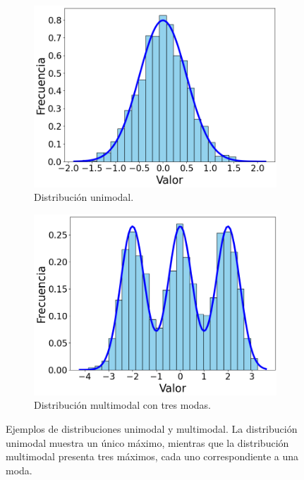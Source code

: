 \begin{figure}[h]
    \centering
    \begin{subfigure}[b]{0.43\textwidth}
        \centering
        \includegraphics[width=\textwidth]{img/experiments/unimodal.png}
        \caption{Distribución unimodal.}\label{fig:unimodal}
    \end{subfigure}
    \hfill
    \begin{subfigure}[b]{0.43\textwidth}
        \centering
        \includegraphics[width=\textwidth]{img/experiments/multimodal.png}
        \caption{Distribución multimodal con tres modas.}\label{fig:multimodal}
    \end{subfigure}
    \caption[Comparación de distribuciones unimodal y multimodal.]{Ejemplos de distribuciones unimodal y multimodal. La distribución unimodal muestra un único máximo, mientras que la distribución multimodal presenta tres máximos, cada uno correspondiente a una moda.}\label{fig:unimodal-multimodal}
\end{figure}

